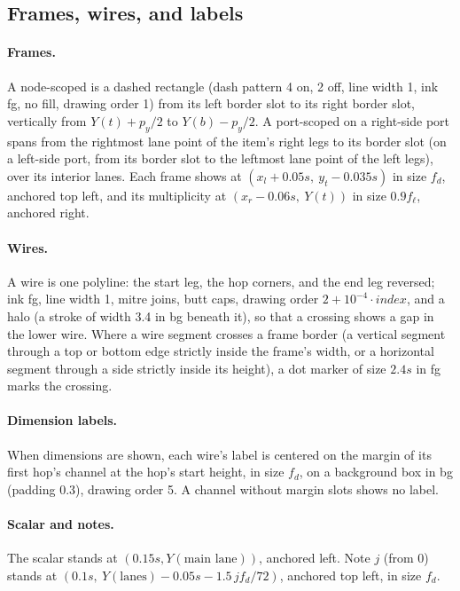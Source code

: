 {\subsection{Frames, wires, and labels}\label{sec:pictorial-figure-frames}

\paragraph{Frames.} A node-scoped \bbox{} is a dashed rectangle (dash pattern 4 on, 2 off,
line width 1, ink fg, no fill, drawing order 1) from its left border slot to its right border
slot, vertically from $Y(t)+p_y/2$ to $Y(b)-p_y/2$. A port-scoped \bbox{} on a right-side port
spans from the rightmost lane point of the item's right legs to its border slot (on a left-side
port, from its border slot to the leftmost lane point of the left legs), over its interior
lanes. Each frame shows \code{!} at $(x_l+0.05s,\ y_t-0.035s)$ in size $f_d$, anchored top left,
and its multiplicity at $(x_r - 0.06s,\ Y(t))$ in size $0.9f_\ell$, anchored right.

\paragraph{Wires.} A wire is one polyline: the start leg, the hop corners, and the end leg
reversed; ink fg, line width 1, mitre joins, butt caps, drawing order
$2+10^{-4}\cdot\mathit{index}$, and a halo (a stroke of width 3.4 in bg beneath it), so that a
crossing shows a gap in the lower wire. Where a wire segment crosses a frame border (a vertical
segment through a top or bottom edge strictly inside the frame's width, or a horizontal segment
through a side strictly inside its height), a dot marker of size $2.4s$ in fg marks the
crossing.

\paragraph{Dimension labels.} When dimensions are shown, each wire's label is centered on the
margin of its first hop's channel at the hop's start height, in size $f_d$, on a background box
in bg (padding 0.3), drawing order 5. A channel without margin slots shows no label.

\paragraph{Scalar and notes.} The scalar stands at $(0.15s, Y(\text{main lane}))$, anchored
left. Note $j$ (from 0) stands at $(0.1s,\ Y(\text{lanes}) - 0.05s - 1.5\,j f_d/72)$, anchored
top left, in size $f_d$.

}
